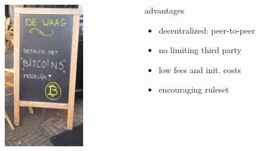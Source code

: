 \documentclass[12pt,english]{beamer}
\begin{document}
\begin{frame}
	\frametitle{}
\begin{columns}[T]
    \begin{column}{.3\textwidth}
		\includegraphics[width=3.5cm]{./img/btc_presentation/pos.jpg}
    \end{column}
    \begin{column}{.5\textwidth}
     \begin{block}{advantages}
	\begin{itemize}
		\item decentralized: peer-to-peer
		\item no limiting third party
		\item low fees and init. costs
		\item encouraging ruleset
	\end{itemize}
    \end{block}
    \end{column}
  \end{columns}
\end{frame}
\end{document}
